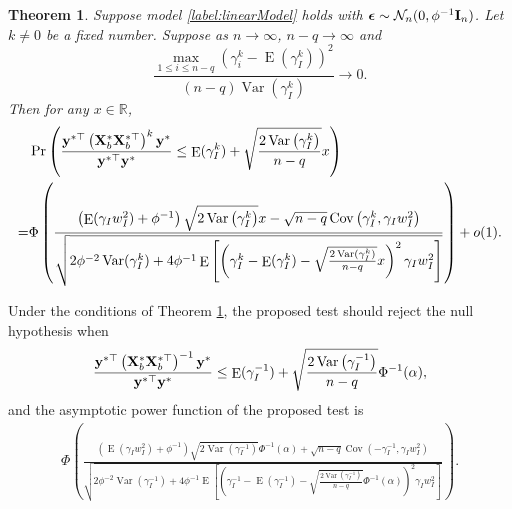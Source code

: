 \documentclass[11pt]{article}
\DeclareMathOperator{\myE}{E}
\DeclareMathOperator{\myVar}{Var}
\DeclareMathOperator{\myCov}{Cov}
\newcommand{\By}{\mathbf{y}}    \newcommand{\Bz}{\mathbf{z}}
\theoremstyle{plain}
\newtheorem{theorem}{\quad\quad Theorem}
\theoremstyle{definition}
\theoremstyle{remark}
\begin{document}
\begin{theorem}\label{generalTheorem}
    Suppose model \eqref{label:linearModel} holds with $\boldsymbol{\epsilon}\sim \mathcal N_n (0,\phi^{-1} \mathbf{I}_n)$.
    Let $k\neq 0$ be a fixed number.
    Suppose as $n\to \infty$, $n-q\to \infty$ and
\begin{equation}
    \frac{
        \max_{1\leq i \leq n-q}
        \left( 
        \gamma_i^k
            -
                \myE (\gamma_I^k)
        \right)^2
    }{
        (n-q) \myVar (\gamma_I^k)
    }\to 0.
    \label{eq:toBeCondition}
\end{equation}
Then for any $x\in \mathbb R$,
\begin{equation*}
    \begin{split}
    &\Pr\left( 
        \frac{
            \By^{*\top} \left( \BX_b^* \BX_b^{*\top} \right)^k \By^*
        }{
            \By^{*\top} \By^*
        } 
        \leq 
        \myE (\gamma_I^k)
        +\sqrt{
            \frac{2\myVar\left( \gamma_I^k \right)}{n-q} 
        }
        x
    \right) 
    \\
    =&
    \Phi\left( 
        \frac{
            \left( \myE (\gamma_I w_I^2) + \phi^{-1} \right)
            \sqrt{{2\myVar\left( \gamma_I^k \right)}} 
            x
            -
            \sqrt{n-q}
            \myCov\left( \gamma_I^k, \gamma_I w_I^2 \right)
        }{
            \sqrt{
                2\phi^{-2} \myVar ( \gamma_I^k ) 
                +
                4\phi^{-1}
     \myE\left[ 
        \left( \gamma_I^k -\myE(\gamma_I^k) -\sqrt{\frac{2\myVar (\gamma_I^k)}{n-q}}x \right)^2
        \gamma_I w_I^2
    \right]
            }
        } 
    \right)
    +o(1)
    .
    \end{split}
\end{equation*}

\end{theorem}
Under the conditions of Theorem \ref{generalTheorem}, the proposed test should reject the null hypothesis when
\begin{equation*}
        \frac{
            \By^{*\top} \left( \BX_b^* \BX_b^{*\top} \right)^{-1} \By^*
        }{
            \By^{*\top} \By^*
        } 
        \leq 
        \myE (\gamma_I^{-1})
        +\sqrt{
            \frac{2\myVar\left( \gamma_I^{-1} \right)}{n-q} 
        }
        \Phi^{-1}(\alpha),
\end{equation*}
and the asymptotic power function of the proposed test is
\begin{equation}\label{eq:powerProposed}
    \begin{split}
    \Phi\left( 
        \frac{
            \left( \myE (\gamma_I w_I^2) + \phi^{-1} \right)
            \sqrt{2\myVar\left( \gamma_I^{-1} \right)} 
            \Phi^{-1}(\alpha)
            +
            \sqrt{n-q}
            \myCov\left( - \gamma_I^{-1}, \gamma_I w_I^2 \right)
        }{
            \sqrt{
                2\phi^{-2} \myVar ( \gamma_I^{-1} ) 
                +
                4\phi^{-1}
        \myE\left[ 
            \left( \gamma_I^{-1} -\myE(\gamma_I^{-1}) -\sqrt{\frac{2\myVar (\gamma_I^{-1})}{n-q}} \Phi^{-1}(\alpha) \right)^2
        \gamma_I w_I^2
    \right]
            }
        } 
    \right).
    \end{split}
\end{equation}
\end{document}
